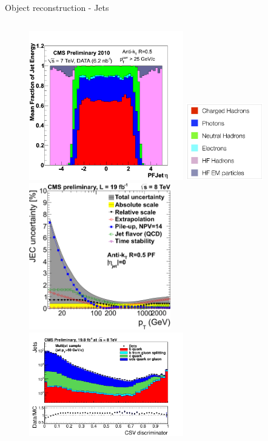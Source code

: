 \begin{frame}{Object reconstruction - Jets}
\begin{columns}
\begin{column}{.45\textwidth}
\begin{figure}[!Hhtbp]
\begin{center}
\includegraphics[width=0.6\textwidth,height=0.33\textheight]{../figs/Jet_composition_data_7TeV.png}
\includegraphics[width=0.3\textwidth]{../figs/Legend_jet_composition.png}\\
\includegraphics[width=0.55\textwidth,height=0.33\textheight]{../figs/JEC_pt.png}\\
\includegraphics[width=0.6\textwidth,height=0.33\textheight]{../figs/pdf-sub.png}
\end{center}
\end{figure}
\end{column}
\end{columns}

\end{frame}